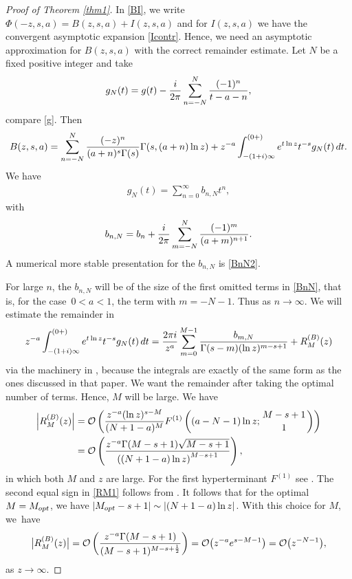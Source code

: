 \documentclass[11pt]{article}
\numberwithin{equation}{section}
\numberwithin{equation}{section}
\newcommand\mytop[2]{\genfrac{}{}{0pt}{}{#1}{#2}}
\def\expe{{\rm e}}
\def\iunit{{\rm i}}
\def\id{\,{\rm d}}
\def\bigO{{\mathcal O}}
\begin{document}
\begin{proof}[Proof of Theorem \ref{thm1}]
In \eqref{BI}, we write $\Phi(-z,s,a)=B(z,s,a)+I(z,s,a)$ and for $I(z,s,a)$
we have the convergent asymptotic expansion \eqref{Icontr}. Hence, we need an asymptotic
approximation for $B(z,s,a)$ with the correct remainder estimate.
Let $N$ be a fixed positive integer and take
\begin{gather*}%
 g_N(t)=g(t)-\frac{\iunit}{2\pi}\sum_{n=-N}^N\frac{(-1)^n}{t-a-n},
\end{gather*}
compare \eqref{g}. Then
\begin{gather*}%
 B(z,s,a)=\sum_{n=-N}^N \frac{(-z)^n}{(a+n)^s\Gamma(s)}\Gamma(s,(a+n)\ln z)
 +z^{-a}\int_{-(1+\iunit)\infty}^{(0+)}\expe^{t\ln z} t^{-s}g_N(t)\id t.
\end{gather*}
We have
\begin{gather*}%
 g_N(t)=\sum_{n=0}^\infty b_{n,N}t^n,
\end{gather*}
with
\begin{gather}\label{BnN}
 b_{n,N}=b_n+\frac{\iunit}{2\pi}\sum_{m=-N}^N \frac{(-1)^m}{(a+m)^{n+1}}.
\end{gather}
A numerical more stable presentation for the $b_{n,N}$ is \eqref{BnN2}.

For large $n$, the $b_{n,N}$ will be of the size of the first omitted terms in \eqref{BnN},
that is, for the case~$0<a<1$, the term with $m=-N-1$.
Thus
\smash{$b_{n,N}\sim \frac{\iunit}{2\pi}(-1)^N (a-N-1)^{-n-1}$} as $n\to\infty$.
We will estimate the remainder in
\begin{gather*}%
 z^{-a}\int_{-(1+\iunit)\infty}^{(0+)}\expe^{t\ln z} t^{-s}g_N(t)\id t
 =\frac{2\pi\iunit}{z^{a}}\sum_{m=0}^{M-1}
 \frac{b_{m,N}}{\Gamma(s-m)(\ln z)^{m-s+1}}+R_M^{(B)}(z)
\end{gather*}
via the machinery in \cite[Section~4]{OD98}, because the integrals are exactly of the same form
as the ones discussed in that paper.
We want the remainder after taking the optimal number of terms. Hence, $M$ will be large.
We have
\begin{align}
 \left|R_M^{(B)}(z)\right|&=\bigO\left(\frac{z^{-a} (\ln z)^{s-M}}{%
 (N+1-a)^{M}}F^{(1)}\left((a-N-1)\ln z;\mytop{M-s+1}{1}\right)\right)\nonumber\\
 &=\bigO\left(\frac{z^{-a} \Gamma(M-s+1)\sqrt{M-s+1}}{%
 \left((N+1-a)\ln z\right)^{M-s+1}}\right),\label{RM1}
\end{align}
in which both $M$ and $z$ are large. For the first hyperterminant $F^{(1)}$ see
\cite[Appendix A]{BHNOD2018}. The second equal sign in \eqref{RM1} follows from
\cite[Proposition~B.1]{BHNOD2018}.
It follows that for the optimal~${M=M_{\rm opt}}$, we have
$|M_{\rm opt}-s+1|\sim |(N+1-a)\ln z|$. With this choice for $M$, we~have
\begin{gather*}%
 \bigl|R_M^{(B)}(z)\bigr|=\bigO\left(\frac{z^{-a}
 \Gamma(M-s+1)}{(M-s+1)^{M-s+\frac12}}\right)=
 \bigO\bigl(z^{-a}\expe^{s-M-1}\bigr)=\bigO\bigl(z^{-N-1}\bigr),
\end{gather*}
as $z\to\infty$.


\end{proof}
\end{document}
